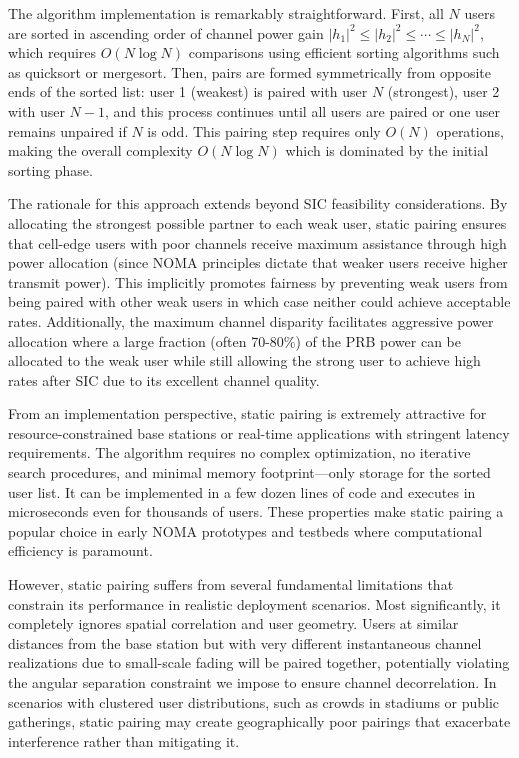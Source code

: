 The algorithm implementation is remarkably straightforward. First, all $N$ users are sorted in ascending order of channel power gain $|h_1|^2 \leq |h_2|^2 \leq \cdots \leq |h_N|^2$, which requires $O(N \log N)$ comparisons using efficient sorting algorithms such as quicksort or mergesort. Then, pairs are formed symmetrically from opposite ends of the sorted list: user 1 (weakest) is paired with user $N$ (strongest), user 2 with user $N-1$, and this process continues until all users are paired or one user remains unpaired if $N$ is odd. This pairing step requires only $O(N)$ operations, making the overall complexity $O(N \log N)$ which is dominated by the initial sorting phase.

The rationale for this approach extends beyond SIC feasibility considerations. By allocating the strongest possible partner to each weak user, static pairing ensures that cell-edge users with poor channels receive maximum assistance through high power allocation (since NOMA principles dictate that weaker users receive higher transmit power). This implicitly promotes fairness by preventing weak users from being paired with other weak users in which case neither could achieve acceptable rates. Additionally, the maximum channel disparity facilitates aggressive power allocation where a large fraction (often 70-80\%) of the PRB power can be allocated to the weak user while still allowing the strong user to achieve high rates after SIC due to its excellent channel quality.

From an implementation perspective, static pairing is extremely attractive for resource-constrained base stations or real-time applications with stringent latency requirements. The algorithm requires no complex optimization, no iterative search procedures, and minimal memory footprint—only storage for the sorted user list. It can be implemented in a few dozen lines of code and executes in microseconds even for thousands of users. These properties make static pairing a popular choice in early NOMA prototypes and testbeds where computational efficiency is paramount.

However, static pairing suffers from several fundamental limitations that constrain its performance in realistic deployment scenarios. Most significantly, it completely ignores spatial correlation and user geometry. Users at similar distances from the base station but with very different instantaneous channel realizations due to small-scale fading will be paired together, potentially violating the angular separation constraint we impose to ensure channel decorrelation. In scenarios with clustered user distributions, such as crowds in stadiums or public gatherings, static pairing may create geographically poor pairings that exacerbate interference rather than mitigating it.

